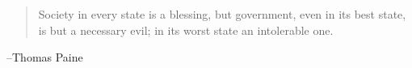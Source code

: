 \documentclass[letterpaper]{exam}
\begin{document}
  \ifprintanswers{}
  \else
    \vspace{8 cm}
    \begin{quote}
      \begin{em}
        Society in every state is a blessing, but government, even in its best state, is but a
        necessary evil; in its worst state an intolerable one. 
      \end{em}
    \end{quote}
    \hspace{1 cm} --Thomas Paine
  \fi
\end{document}

